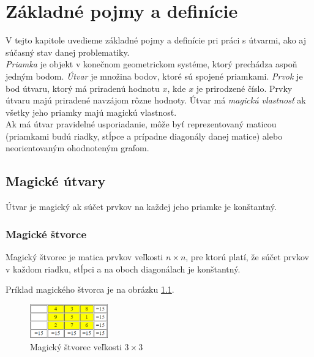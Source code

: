 \chapter{Základné pojmy a definície}

\label{kap:definitions} %

V tejto kapitole uvedieme základné pojmy a definície pri práci s útvarmi, ako aj súčasný stav danej problematiky. \\

\textit{Priamka} je objekt v konečnom geometrickom systéme, ktorý prechádza aspoň jedným bodom. \textit{Útvar} je množina bodov, ktoré sú spojené priamkami. \textit{Prvok} je bod útvaru, ktorý má priradenú hodnotu $x$, kde $x$ je prirodzené číslo. Prvky útvaru majú priradené navzájom rôzne hodnoty. Útvar má \textit{magickú vlastnosť} ak všetky jeho priamky majú magickú vlastnosť. \\

Ak má útvar pravidelné usporiadanie, môže byť reprezentovaný maticou (priamkami budú riadky, stĺpce a prípadne diagonály danej matice) alebo neorientovaným ohodnoteným grafom.

\section{Magické útvary}
\begin{definition} Útvar je magický ak súčet prvkov na každej jeho priamke je konštantný.
\end{definition}

\subsection{Magické štvorce}
\begin{subdefinition} Magický štvorec je matica prvkov veľkosti $n \times n$, pre ktorú platí, že súčet prvkov v každom riadku, stĺpci a na oboch diagonálach je konštantný.
\end{subdefinition}

Príklad magického štvorca je na obrázku \ref{obr:fig_basic_magic_3x3}.

\begin{figure}[H]
\centerline{\includegraphics[width=0.3\textwidth]{images/basic_magic_3x3}}
\caption[Magický štvorec veľkosti $3 \times 3$]{Magický štvorec veľkosti $3 \times 3$ \cite{multimagie}}
\label{obr:fig_basic_magic_3x3}
\end{figure}

